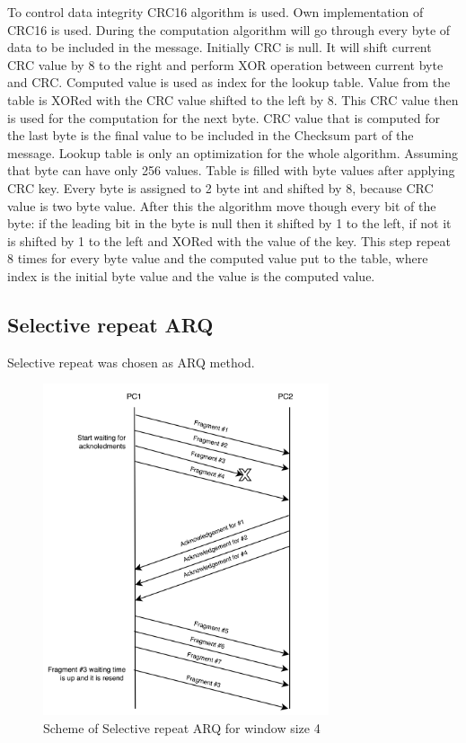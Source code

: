 \documentclass{article}
\begin{document}
To control data integrity CRC16 algorithm is used. 
Own implementation of CRC16 is used.
During the computation algorithm will go  through every byte of data to be included in the message. Initially CRC is null. It will shift current CRC value by 8 to the right and perform XOR operation between current byte and CRC. Computed value is used as index for the lookup table. Value from the table is XORed with the CRC value shifted to the left by 8. This CRC value then is used for the computation for the next byte. CRC value that is computed for the last byte is the final value to be included in the Checksum part of the message. \newline
Lookup table is only an optimization for the whole algorithm. Assuming that byte can have only 256 values.
Table is filled with byte values after applying CRC key. Every byte is assigned to 2 byte int and shifted by 8, because CRC value is two byte value. After this the algorithm move though every bit of the byte: if the leading bit in the byte is null then it shifted by 1 to the left, if not it is shifted by 1 to the left and XORed with the value of the key. This step repeat 8 times for every byte value and the computed value put to the table, where index is the initial byte value and the value is the computed value.


\subsection{Selective repeat ARQ}
Selective repeat was chosen as ARQ method. 

\begin{figure}[!h]
    \centering
    \includegraphics[width=0.75\textwidth]{images/selectiverepeat.png}
    \caption{Scheme of Selective repeat ARQ for window size 4}
    \label{fig:mesh1}
\end{figure}
\end{document}
